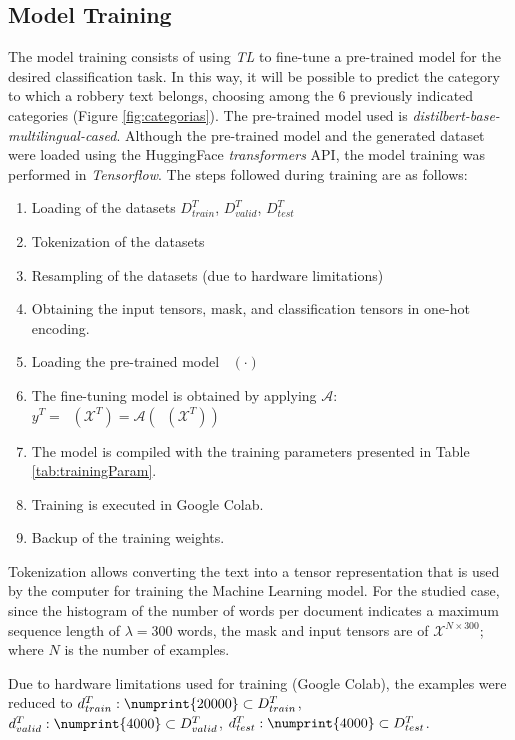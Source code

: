 \documentclass[onecolumn, journal, english, 12pt, a4paper]{IEEEtran} %
\newcommand{\modelohuggingface}{distilbert-base-multilingual-cased}
\DeclareMathOperator{\ypredtarget}{\phi^{T}}
\DeclareMathOperator{\ypredsource}{\phi^{S}}
\theoremstyle{definition}
\begin{document}
\subsection{Model Training}
The model training consists of using \emph{TL} to fine-tune a
pre-trained model for the desired classification task. In this way, it
will be possible to predict the category to which a robbery text
belongs, choosing among the 6 previously indicated categories (Figure
\ref{fig:categorias}). The pre-trained model used is
\emph{\modelohuggingface}. Although the pre-trained model and the
generated dataset were loaded using the HuggingFace
\emph{transformers} API, the model training was performed in
\emph{Tensorflow}. The steps followed during training are as follows:

\begin{enumerate}
    \item Loading of the datasets $D^T_{train}$, $D^T_{valid}$, $D^T_{test}$
    \item Tokenization of the datasets
    \item Resampling of the datasets (due to hardware limitations)
    \item Obtaining the input tensors, mask, and classification
      tensors in one-hot encoding.
    \item Loading the pre-trained model $\ypredsource(\cdot)$
    \item The fine-tuning model is obtained by applying $\mathcal{A}$: $y^T = \ypredtarget(\mathbf{\mathcal{X}}^T) =  \mathcal{A}(\ypredsource(\mathbf{\mathcal{X}}^T))$
    \item The model is compiled with the training parameters presented
      in Table \ref{tab:trainingParam}.
    \item Training is executed in Google Colab.
    \item Backup of the training weights.
\end{enumerate}

Tokenization allows converting the text into a tensor representation
that is used by the computer for training the Machine Learning
model. For the studied case, since the histogram of the number of
words per document indicates a maximum sequence length of
$\lambda = 300$ words, the mask and input tensors are of
$\mathbf{\mathcal{X}}^{N\times300}$; where $N$ is the number of
examples.

Due to hardware limitations used for training (Google Colab), the
examples were reduced to
$d^T_{train}:\numprint{20000} \subset D^T_{train}$,
$d^T_{valid}:\numprint{4000} \subset D^T_{valid}$,
$d^T_{test}:\numprint{4000} \subset D^T_{test}$.
\end{document}
